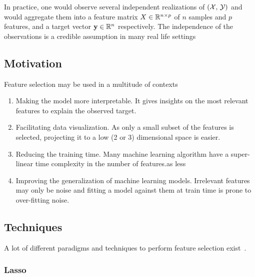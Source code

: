 In practice, one would observe several independent realizations of
$\left( \mathcal{X},\, \mathcal{Y} \right)$ and would aggregate them into a feature matrix
$X \in \mathbb{R}^{n \times p}$ of $n$ samples and $p$ features, and a target vector $\mathbf{y} \in \mathbb{R}^n$ respectively.
The independence of the observations is a credible assumption in many real life settings

\subsection{Motivation}\label{subsec:fs_motivation}

Feature selection may be used in a multitude of contexts
\begin{enumerate}
        \item Making the model more interpretable.
                It gives insights on the most relevant features to explain the observed target.
        \item Facilitating data visualization.
                As only a small subset of the features is selected,
                projecting it to a low (2 or 3) dimensional space is easier.
        \item Reducing the training time.
                Many machine learning algorithm have a super-linear time complexity in the number of features.as less
        \item Improving the generalization of machine learning models.
                Irrelevant features may only be noise and fitting a model against them at train time
                is prone to over-fitting noise.
\end{enumerate}


\subsection{Techniques}\label{subsec:fst}

A lot of different paradigms and techniques to perform feature selection exist~\cite{intro_fs}.

\subsubsection{Lasso}\label{subsubsec:lasso}

